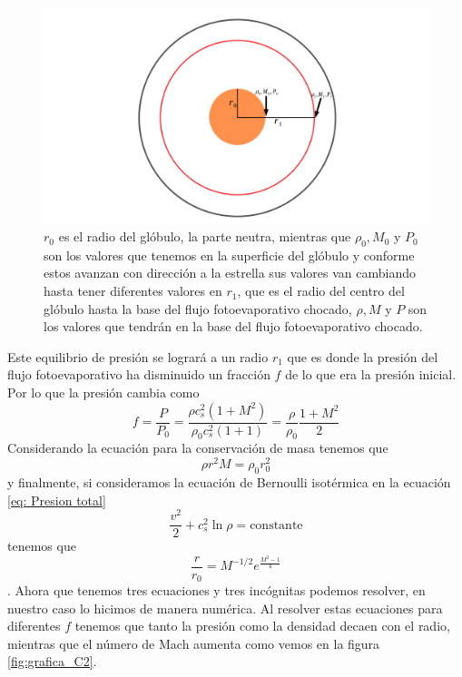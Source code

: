 \documentclass{book}
\begin{document}
\begin{figure}[htb]
    \centering \includegraphics[width=\textwidth]{artesanales/ImgFi01-3.pdf}
    \caption{$r_0$ es el radio del glóbulo, la parte neutra, mientras que $\rho_0,M_0$ y $P_0$ son los valores que tenemos en la superficie del glóbulo y conforme estos avanzan con dirección a la estrella sus valores van cambiando hasta tener diferentes valores en $r_1$, que es el radio del centro del glóbulo hasta la base del flujo fotoevaporativo chocado, $\rho,M$ y $P$ son los valores que tendrán en la base del flujo fotoevaporativo chocado.}
    \label{fig:parameters}
\end{figure}

Este equilibrio de presión se logrará a un radio $r_1$ que es donde la presión del flujo fotoevaporativo ha disminuido un fracción $f$ de lo que era la presión inicial. Por lo que la presión cambia como 
\begin{equation}\label{eq : 1}
f=\frac{P}{P_0}=\frac{\rho c_s^2(1+M^2)}{\rho_0 c_s^2(1+1)}=\frac{\rho}{\rho_0}\frac{1+M^2}{2}
\end{equation}
Considerando la ecuación para la conservación de masa tenemos que
\begin{equation}\label{eq : 2}
\rho r^2M	=\rho_0 r_0^2
\end{equation}
y finalmente, si consideramos la ecuación de Bernoulli isotérmica en la ecuación \ref{eq: Presion total}
\[\frac{v^2}{2}+c_s^2\ln\rho=\text{constante}\]
tenemos que 
\begin{equation}\label{eq ; 3} \frac{r}{r_0}=M^{-1/2}e^{\frac{M^2-1}{4}}
\end{equation}
\citep{Dyson:1968}.
Ahora que tenemos tres ecuaciones y tres incógnitas podemos resolver, en nuestro caso lo hicimos de manera numérica. Al resolver estas ecuaciones para diferentes $f$ tenemos que tanto la presión como la densidad decaen con el radio, mientras que el número de Mach aumenta como vemos en la figura \ref{fig:grafica_C2}.
\end{document}
